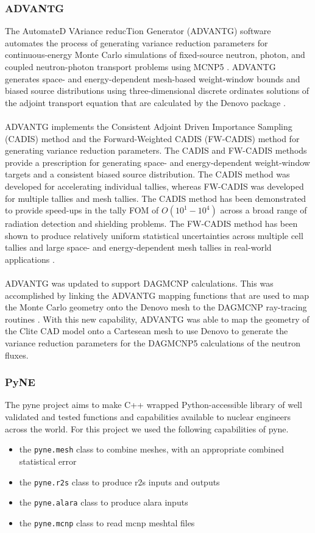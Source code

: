 \documentclass[12pt]{article}
\begin{document}
\subsubsection{ADVANTG}
The AutomateD VAriance reducTion Generator (ADVANTG) software automates the process of generating variance reduction parameters for continuous-energy Monte Carlo simulations of fixed-source neutron, photon, and coupled neutron-photon transport problems using MCNP5 \cite{advantg} . ADVANTG generates space- and energy-dependent mesh-based weight-window bounds and biased source distributions using three-dimensional discrete ordinates solutions of the adjoint transport equation that are calculated by the Denovo package \cite{denovo}. 
\\
\\
ADVANTG implements the Consistent Adjoint Driven Importance Sampling (CADIS) method \cite{wagnerNSECADIS} and the Forward-Weighted CADIS (FW-CADIS) method \cite{wagnerNSEFWCADIS}  for generating variance reduction parameters. The CADIS and FW-CADIS methods provide a prescription for generating space- and energy-dependent weight-window targets and a consistent biased source distribution. The CADIS method was developed for accelerating individual tallies, whereas FW-CADIS was developed for multiple tallies and mesh tallies. The CADIS method has been demonstrated to provide speed-ups in the tally FOM of $O(10^{1}-10^{4})$ across a broad range of radiation detection and shielding problems. The FW-CADIS method has been shown to produce relatively uniform statistical uncertainties across multiple cell tallies and large space- and energy-dependent mesh tallies in real-world applications \cite{wagnerNSEFWCADIS} .
\\
\\
ADVANTG was updated to support DAGMCNP calculations. This was accomplished by linking the ADVANTG mapping functions that are used to map the Monte Carlo geometry onto the Denovo mesh to the DAGMCNP ray-tracing routines \cite{biondoMC2015}. With this new capability, ADVANTG was able to map the geometry of the Clite CAD model onto a Cartesean mesh to use Denovo to generate the variance reduction parameters for the DAGMCNP5 calculations of the neutron fluxes.

\subsubsection{PyNE}
The \gls{pyne} \cite{Scopatz2012b} project aims to
make C++ wrapped Python-accessible library of well validated and tested
functions and capabilities available to nuclear engineers across the world.
For this project we used the following capabilities of \gls{pyne}.
\begin{itemize}
  \item{the \texttt{pyne.mesh} class to combine meshes, with an appropriate
        combined statistical error}
  \item{the \texttt{pyne.r2s} class to produce \gls{r2s} inputs and outputs}
  \item{the \texttt{pyne.alara} class to produce alara inputs}
  \item{the \texttt{pyne.mcnp} class to read \gls{mcnp} meshtal files}
\end{itemize}
\end{document}

